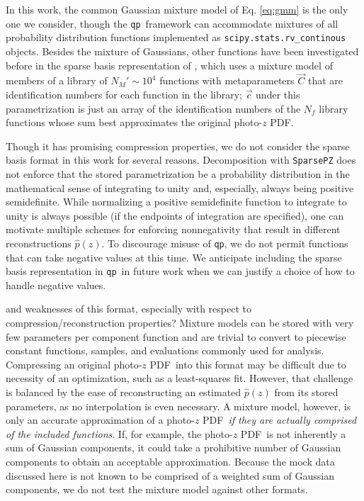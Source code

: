 \documentclass[\docopts]{\docclass}
\newcommand{\qp}{\texttt{qp}}
\newcommand{\pz}{photo-$z$ PDF}
\begin{document}
In this work, the common Gaussian mixture model of Eq. \ref{eq:gmm} is the only 
one we consider, though the \qp\ framework can accommodate mixtures of all 
probability distribution functions implemented as 
\texttt{scipy.stats.rv\_continous} objects.  Besides the mixture of Gaussians, 
other functions have been investigated before in the sparse basis 
representation of \citet{carrasco_kind_sparse_2014}, which uses a mixture model 
of members of a library of $N_{M}'\sim10^{4}$ functions with metaparameters 
$\vec{C}$ that are identification numbers for each function in the library; 
$\vec{c}$ under this parametrization is just an array of the identification 
numbers of the $N_{f}$ library functions whose sum best approximates the 
original \pz.

Though it has promising compression properties, we do not consider the sparse 
basis format in this work for several reasons.  Decomposition with 
\texttt{SparsePZ} does not enforce that the stored parametrization be a 
probability distribution in the mathematical sense of integrating to unity and, 
especially, always being positive semidefinite.  While normalizing a positive 
semidefinite function to integrate to unity is always possible (if the 
endpoints of integration are specified), one can motivate multiple schemes for 
enforcing nonnegativity that result in different reconstructions $\hat{p}(z)$.  
To discourage misuse of \qp, we do not permit functions that can take negative 
values at this time.     We anticipate 
including the sparse basis representation in \qp\ in future work when we can 
justify a choice of how to handle negative values.


and weaknesses of this format, especially with respect to 
compression/reconstruction properties?
Mixture models can be stored with very few parameters per component function 
and are trivial to convert to piecewise constant functions, samples, and 
evaluations commonly used for analysis.  Compressing an original \pz\ into this 
format may be difficult due to necessity of an optimization, such as a 
least-squares fit.  However, that challenge is balanced by the ease of 
reconstructing an estimated $\hat{p}(z)$ from its stored parameters, as no 
interpolation is even necessary.  A mixture model, however, is only an accurate 
approximation of a \pz\ \textit{if they are actually comprised of the included 
functions}.  If, for example, the \pz\ is not inherently a sum of Gaussian 
components, it could take a prohibitive number of Gaussian components to obtain 
an acceptable approximation.  Because the mock data discussed here is not known 
to be comprised of a weighted sum of Gaussian components, we do not test the 
mixture model against other formats.  
\end{document}
